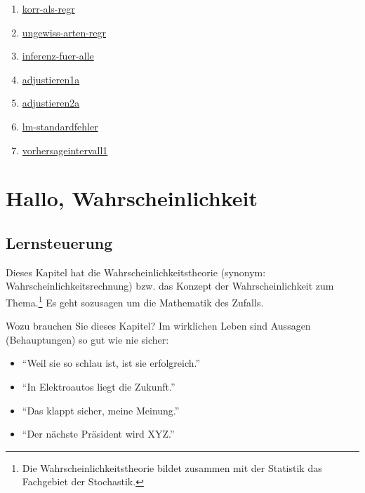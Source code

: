 \documentclass[
  ngerman,
  letterpaper,
  twoside,
  open=any]{scrbook}
\providecommand{\tightlist}{%
  \setlength{\itemsep}{0pt}\setlength{\parskip}{0pt}}\usepackage{longtable,booktabs,array}
\theoremstyle{definition}
\theoremstyle{plain}
\theoremstyle{definition}
\theoremstyle{definition}
\theoremstyle{remark}
\begin{document}
\begin{enumerate}
\def\labelenumi{\arabic{enumi}.}
\tightlist
\item
  \href{https://datenwerk.netlify.app/posts/korr-als-regr/korr-als-regr.html}{korr-als-regr}
\item
  \href{https://datenwerk.netlify.app/posts/ungewiss-arten-regr/ungewiss-arten-regr.html}{ungewiss-arten-regr}
\item
  \href{https://datenwerk.netlify.app/posts/inferenz-fuer-alle/inferenz-fuer-alle.html}{inferenz-fuer-alle}
\item
  \href{https://datenwerk.netlify.app/posts/adjustieren1a/adjustieren1a.html}{adjustieren1a}
\item
  \href{https://datenwerk.netlify.app/posts/adjustieren2a/adjustieren2a.html}{adjustieren2a}
\item
  \href{https://datenwerk.netlify.app/posts/lm-standardfehler/lm-standardfehler.html}{lm-standardfehler}
\item
  \href{https://datenwerk.netlify.app/posts/vorhersageintervall1/vorhersageintervall1.html}{vorhersageintervall1}
\end{enumerate}

\chapter{Hallo, Wahrscheinlichkeit}\label{hallo-wahrscheinlichkeit}

\section{Lernsteuerung}\label{lernsteuerung-2}

Dieses Kapitel hat die Wahrscheinlichkeitstheorie (synonym:
Wahrscheinlichkeitsrechnung) bzw. das Konzept der Wahrscheinlichkeit zum
Thema.\footnote{Die Wahrscheinlichkeitstheorie bildet zusammen mit der
  Statistik das Fachgebiet der Stochastik.} Es geht sozusagen um die
Mathematik des Zufalls.

Wozu brauchen Sie dieses Kapitel? Im wirklichen Leben sind Aussagen
(Behauptungen) so gut wie nie sicher:

\begin{itemize}
\tightlist
\item
  \enquote{Weil sie so schlau ist, ist sie erfolgreich.}
\item
  \enquote{In Elektroautos liegt die Zukunft.}
\item
  \enquote{Das klappt sicher, meine Meinung.}
\item
  \enquote{Der nächste Präsident wird XYZ.}
\end{itemize}
\end{document}
